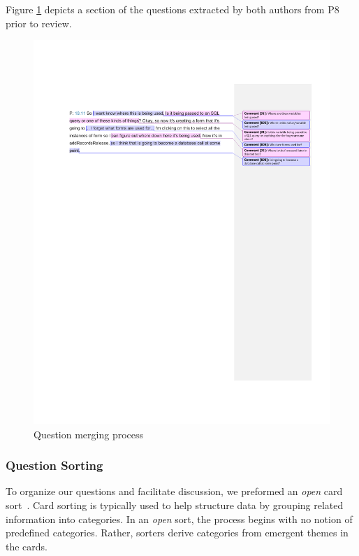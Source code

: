 \documentclass[conference]{IEEEtran}
\begin{document}
Figure \ref{fig:merging} depicts a section of the questions extracted by both authors from P8 prior to review.

\begin{figure}
\centering
\includegraphics[width=7.5in]{Images/QuestionMerging}
\caption{Question merging process}
\label{fig:merging} 
\end{figure}

\subsubsection{Question Sorting}
To organize our questions and facilitate discussion, we preformed an \textit{open} card sort~\cite{hudson2013sorting}. 
Card sorting is typically used to help structure data by grouping related information into categories. 
In an \textit{open} sort, the process begins with no notion of predefined categories. 
Rather, sorters derive categories from emergent themes in the cards. 
\end{document}
